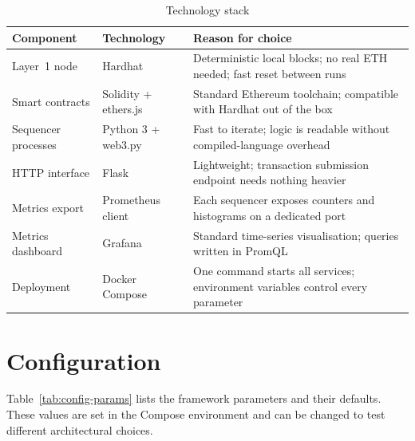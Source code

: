 \begin{table}[htbp]
    \centering
    \small
    \setlength{\tabcolsep}{3pt}
    \renewcommand{\arraystretch}{1.05}
    \begin{tabular}{@{}>{\raggedright\arraybackslash}p{3.4cm}|>{\raggedright\arraybackslash}p{4.0cm}|>{\raggedright\arraybackslash}p{6.0cm}@{}}
        \hline
        \textbf{Component} & \textbf{Technology} & \textbf{Reason for choice} \\
        \hline
        Layer~1 node & Hardhat~\cite{hardhat2024} & Deterministic local blocks; no real ETH needed; fast reset between runs \\
        \hline
        Smart contracts & Solidity + ethers.js & Standard Ethereum toolchain; compatible with Hardhat out of the box \\
        \hline
        Sequencer processes & Python 3 + web3.py & Fast to iterate; logic is readable without compiled-language overhead \\
        \hline
        HTTP interface & Flask~\cite{flask2024} & Lightweight; transaction submission endpoint needs nothing heavier \\
        \hline
        Metrics export & Prometheus client & Each sequencer exposes counters and histograms on a dedicated port \\
        \hline
        Metrics dashboard & Grafana~\cite{grafana2024} & Standard time-series visualisation; queries written in PromQL \\
        \hline
        Deployment & Docker Compose~\cite{compose2024} & One command starts all services; environment variables control every parameter \\
        \hline
    \end{tabular}
    \caption{Technology stack}
    \label{tab:tech-stack}
\end{table}

\section{Configuration}

Table~\ref{tab:config-params} lists the framework parameters and their defaults. These values are set in the Compose environment and can be changed to test different architectural choices.

